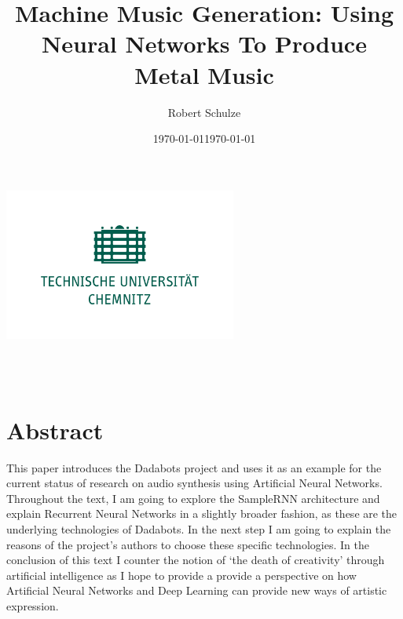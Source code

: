 \documentclass[a4paper, 11pt]{report}
\author{Robert Schulze}
\title{Machine Music Generation: Using Neural Networks To Produce Metal Music}
\date{\today}
\begin{document}
\begin{titlepage}
    \begin{center}
        \includegraphics[height=5cm]{tuc-gruen.png}
        
        \begin{large}
            \thetitle \\
            \theauthor \\
            \date{\today}  
            
        \end{large}
        
    \end{center}
\end{titlepage}

\renewcommand{\thechapter}{\Roman{chapter}}

\setcounter{page}{1} 

\tableofcontents

\chapter*{Abstract}

This paper introduces the Dadabots project and uses it as an example for the 
current status of research on audio synthesis using Artificial Neural 
Networks. Throughout the text, I am going to explore the SampleRNN architecture 
and explain Recurrent Neural Networks in a slightly broader fashion, as these 
are the underlying technologies of Dadabots. In the next step I am going to 
explain the reasons of the project’s authors to choose these specific 
technologies. In the conclusion of this text I counter the notion of ‘the death 
of creativity’ through artificial intelligence as I hope to provide a provide 
a perspective on how Artificial Neural Networks and Deep Learning can 
provide new ways of artistic expression.
\end{document}
